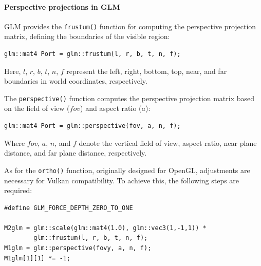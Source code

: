 \paragraph*{Perspective projections in GLM}
GLM provides the \texttt{frustum()} function for computing the perspective projection matrix, defining the boundaries of the visible region:
\begin{verbatim}
glm::mat4 Port = glm::frustum(l, r, b, t, n, f);
\end{verbatim}
Here, $l$, $r$, $b$, $t$, $n$, $f$ represent the left, right, bottom, top, near, and far boundaries in world coordinates, respectively.

The \texttt{perspective()} function computes the perspective projection matrix based on the field of view ($fov$) and aspect ratio ($a$):
\begin{verbatim}
glm::mat4 Port = glm::perspective(fov, a, n, f);
\end{verbatim}
Where $fov$, $a$, $n$, and $f$ denote the vertical field of view, aspect ratio, near plane distance, and far plane distance, respectively.

As for the \texttt{ortho()} function, originally designed for OpenGL, adjustments are necessary for Vulkan compatibility. 
To achieve this, the following steps are required: 
\begin{verbatim}
#define GLM_FORCE_DEPTH_ZERO_TO_ONE

M2glm = glm::scale(glm::mat4(1.0), glm::vec3(1,-1,1)) * 
        glm::frustum(l, r, b, t, n, f);
M1glm = glm::perspective(fovy, a, n, f);
M1glm[1][1] *= -1;
\end{verbatim}

